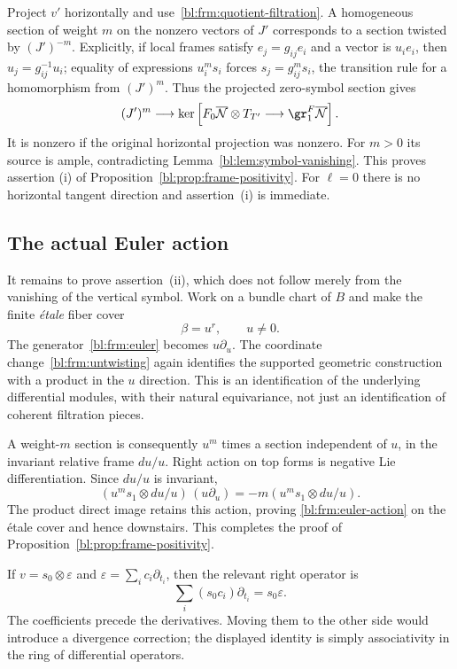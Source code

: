 Project $v'$ horizontally and use~\eqref{bl:frm:quotient-filtration}.
A homogeneous section of weight $m$ on the nonzero vectors of
$J'$ corresponds to a section twisted by $(J')^{-m}$. Explicitly,
if local frames satisfy $e_j=g_{ij}e_i$ and a vector is $u_ie_i$,
then $u_j=g_{ij}^{-1}u_i$; equality of expressions $u_i^m s_i$
forces $s_j=g_{ij}^m s_i$, the transition rule for a homomorphism
from $(J')^m$. Thus the projected zero-symbol section gives
\begin{equation}\label{bl:frm:ample-map}
 (J')^m\longrightarrow
 \ker\left[F_0\overline{\mathcal N}\otimes T_{T'}
                   \longrightarrow\gr_1^F\overline{\mathcal N}\right].
\end{equation}
It is nonzero if the original horizontal projection was nonzero.
For $m>0$ its source is ample, contradicting
Lemma~\ref{bl:lem:symbol-vanishing}. This proves assertion
\textup{(i)} of Proposition~\ref{bl:prop:frame-positivity}.
For $\ell=0$ there is no horizontal tangent direction and
assertion~\textup{(i)} is immediate.

\subsection{The actual Euler action}

It remains to prove assertion~\textup{(ii)}, which does not follow
merely from the vanishing of the vertical symbol. Work on a
bundle chart of $B$ and make the finite \emph{\'etale} fiber cover
\[
 \beta=u^r,\qquad u\ne0.
\]
The generator~\eqref{bl:frm:euler} becomes $u\partial_u$.
The coordinate change~\eqref{bl:frm:untwisting} again identifies the
supported geometric construction with a product in the $u$ direction. This is an
identification of the underlying differential modules, with their
natural equivariance, not just an identification of coherent
filtration pieces.

A weight-$m$ section is consequently $u^m$ times a section
independent of $u$, in the invariant relative frame $du/u$.
Right action on top forms is negative Lie differentiation.
Since $du/u$ is invariant,
\[
 (u^m s_1\otimes du/u)\,(u\partial_u)
       =-m(u^m s_1\otimes du/u).
\]
The product direct image retains this action, proving
\eqref{bl:frm:euler-action} on the \'{e}tale cover and hence downstairs.
This completes the proof of Proposition~\ref{bl:prop:frame-positivity}.

\begin{remark}\label{bl:frm:operator-order}
If $v=s_0\otimes\varepsilon$ and
$\varepsilon=\sum_i c_i\partial_{t_i}$, then the relevant
right operator is
\[
 \sum_i(s_0c_i)\partial_{t_i}=s_0\varepsilon.
\]
The coefficients precede the derivatives. Moving them to the
other side would introduce a divergence correction; the displayed
identity is simply associativity in the ring of differential
operators.
\end{remark}
